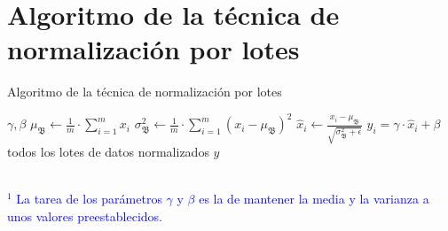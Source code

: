 \section{Algoritmo de la técnica de normalización por lotes}

\begin{algorithm}
\caption{Algoritmo de la técnica de normalización por lotes \cite{BatchNormalization}}
\label{alg:BatchNormalization}
\begin{algorithmic}[1]
        \State \VARIABLES $\gamma, \beta$ \textcolor{blue}{\footnotemark[1]} 
        \Repeat
                \State $\mu_\mathfrak{B} \gets \frac{1}{m}\cdot \sum\limits_{i=1}^{m} x_i$ 
                \State $\sigma_\mathfrak{B}^{2} \gets \frac{1}{m}\cdot \sum\limits_{i=1}^{m} (x_i - \mu_\mathfrak{B})^2 $ 
                \State $\hat{x}_i \gets \frac{x_i - \mu_\mathfrak{B}}{\sqrt{\sigma_\mathfrak{B}^{2} + \epsilon}}$
                \State $y_i = \gamma \cdot \hat{x}_i + \beta$
            \EndFor
        \Until todos los lotes de datos normalizados
        \State \Return $y$
    \EndFunction
\end{algorithmic}
\textcolor{blue}{\footnotesize{\\ $^1$ La tarea de los parámetros $ \gamma $ y $\beta$ es la de mantener la media y la varianza a unos valores preestablecidos.}}
\end{algorithm}
